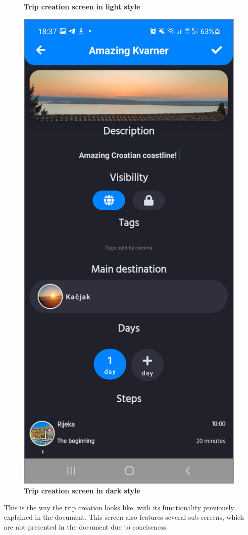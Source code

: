 \begin{figure}[!htb]
\begin{minipage}{.48\textwidth}
\caption{\label{fig:dbapiuser}\textbf{Trip creation screen in light style}}
\end{minipage} 
\begin{minipage}{.48\textwidth}
\centering
\includegraphics[width=.9\textwidth]{../Images/UI/TripCreateDark.jpg}
\caption{\label{fig:dbapiuser}\textbf{Trip creation screen in dark style}}
\end{minipage}
\end{figure}

This is the way the trip creation looks like, with its functionality previously explained in the document. This screen also features several sub screens, which are not presented in the document due to conciseness.